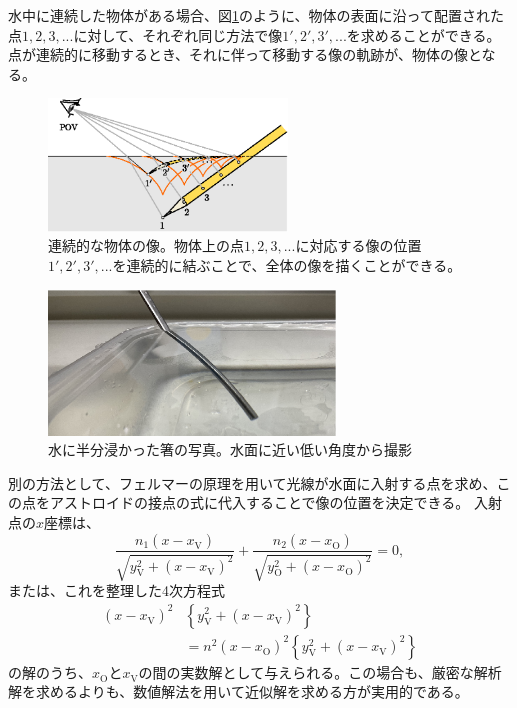 \documentclass[twocolumn]{article}
\begin{document}
水中に連続した物体がある場合、図\ref{fig:extended_image}のように、物体の表面に沿って配置された点$1, 2, 3, ...$に対して、それぞれ同じ方法で像$1', 2', 3', ...$を求めることができる。点が連続的に移動するとき、それに伴って移動する像の軌跡が、物体の像となる。

\begin{figure}[h]
	\centering
	\includegraphics*[width=2.5in]{figs/g242.eps}
	\caption{連続的な物体の像。物体上の点$1, 2, 3, ...$に対応する像の位置$1', 2', 3', ...$を連続的に結ぶことで、全体の像を描くことができる。}
	\label{fig:extended_image}
\end{figure}

\begin{figure}[h]
	\centering
	\includegraphics[width=3in]{figs/img_1805_2.eps}
	\caption{水に半分浸かった箸の写真。水面に近い低い角度から撮影}
	\label{fig:picture}
\end{figure}
	
別の方法として、フェルマーの原理を用いて光線が水面に入射する点を求め、この点をアストロイドの接点の式に代入することで像の位置を決定できる。
入射点の$x$座標は、
\[
\dfrac{n_1 \left( x - x_{\mathrm{V}}^{} \right)}{\sqrt{ y_{\mathrm{V}}^2 + \left( x - x_{\mathrm{V}}^{} \right)^2 }}
+\dfrac{n_2 \left( x - x_{\mathrm{O}}^{} \right)}{\sqrt{ y_{\mathrm{O}}^2 + \left( x - x_{\mathrm{O}}^{} \right)^2 }}
= 0,
\]
または、これを整理した4次方程式
\[ \begin{aligned}
	\left( x - x_{\mathrm{V}}^{} \right)^2 & \left\{ y_{\mathrm{V}}^2 + \left(x - x_{\mathrm{V}}^{} \right)^2 \right\}\\
	&= n^2 \left( x - x_{\mathrm{O}}^{} \right)^2 \left\{ y_{\mathrm{V}}^2 + \left(x - x_{\mathrm{V}}^{} \right)^2 \right\}
\end{aligned}
\]
の解のうち、$x_{\mathrm{O}}^{}$と$x_{\mathrm{V}}^{}$の間の実数解として与えられる。この場合も、厳密な解析解を求めるよりも、数値解法を用いて近似解を求める方が実用的である。
\end{document}

